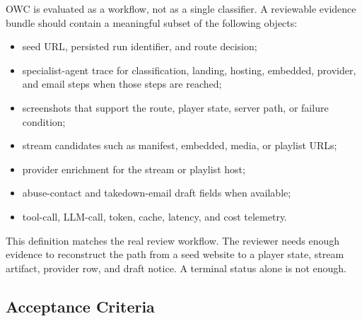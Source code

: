 OWC is evaluated as a workflow, not as a single classifier. A reviewable evidence
bundle should contain a meaningful subset of the following objects:
\begin{itemize}
  \item seed URL, persisted run identifier, and route decision;
  \item specialist-agent trace for classification, landing, hosting, embedded, provider,
  and email steps when those steps are reached;
  \item screenshots that support the route, player state, server path, or failure
  condition;
  \item stream candidates such as manifest, embedded, media, or playlist URLs;
  \item provider enrichment for the stream or playlist host;
  \item abuse-contact and takedown-email draft fields when available;
  \item tool-call, LLM-call, token, cache, latency, and cost telemetry.
\end{itemize}

This definition matches the real review workflow. The reviewer needs enough evidence to
reconstruct the path from a seed website to a player state, stream artifact, provider
row, and draft notice. A terminal status alone is not enough.



\subsection{Acceptance Criteria}


